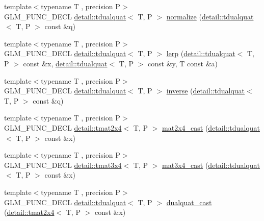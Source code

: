 \begin{DoxyCompactItemize}
\item 
{\footnotesize template$<$typename T , precision P$>$ }\\G\+L\+M\+\_\+\+F\+U\+N\+C\+\_\+\+D\+E\+CL \hyperlink{structglm_1_1detail_1_1tdualquat}{detail\+::tdualquat}$<$ T, P $>$ \hyperlink{group__gtc__dual__quaternion_ga4364d115fe8ee2f65ff047726133d0ad}{normalize} (\hyperlink{structglm_1_1detail_1_1tdualquat}{detail\+::tdualquat}$<$ T, P $>$ const \&q)
\item 
{\footnotesize template$<$typename T , precision P$>$ }\\G\+L\+M\+\_\+\+F\+U\+N\+C\+\_\+\+D\+E\+CL \hyperlink{structglm_1_1detail_1_1tdualquat}{detail\+::tdualquat}$<$ T, P $>$ \hyperlink{group__gtc__dual__quaternion_ga28cbcf029272d5351d4695b8610de126}{lerp} (\hyperlink{structglm_1_1detail_1_1tdualquat}{detail\+::tdualquat}$<$ T, P $>$ const \&x, \hyperlink{structglm_1_1detail_1_1tdualquat}{detail\+::tdualquat}$<$ T, P $>$ const \&y, T const \&a)
\item 
{\footnotesize template$<$typename T , precision P$>$ }\\G\+L\+M\+\_\+\+F\+U\+N\+C\+\_\+\+D\+E\+CL \hyperlink{structglm_1_1detail_1_1tdualquat}{detail\+::tdualquat}$<$ T, P $>$ \hyperlink{group__gtc__dual__quaternion_gaad6b9faeb1134c04defae01426a777f8}{inverse} (\hyperlink{structglm_1_1detail_1_1tdualquat}{detail\+::tdualquat}$<$ T, P $>$ const \&q)
\item 
{\footnotesize template$<$typename T , precision P$>$ }\\G\+L\+M\+\_\+\+F\+U\+N\+C\+\_\+\+D\+E\+CL \hyperlink{structglm_1_1detail_1_1tmat2x4}{detail\+::tmat2x4}$<$ T, P $>$ \hyperlink{group__gtc__dual__quaternion_gade155fb0dfc144259a25897776e73325}{mat2x4\+\_\+cast} (\hyperlink{structglm_1_1detail_1_1tdualquat}{detail\+::tdualquat}$<$ T, P $>$ const \&x)
\item 
{\footnotesize template$<$typename T , precision P$>$ }\\G\+L\+M\+\_\+\+F\+U\+N\+C\+\_\+\+D\+E\+CL \hyperlink{structglm_1_1detail_1_1tmat3x4}{detail\+::tmat3x4}$<$ T, P $>$ \hyperlink{group__gtc__dual__quaternion_ga2f4f0a1275fa95c272dd6ad6df75013d}{mat3x4\+\_\+cast} (\hyperlink{structglm_1_1detail_1_1tdualquat}{detail\+::tdualquat}$<$ T, P $>$ const \&x)
\item 
{\footnotesize template$<$typename T , precision P$>$ }\\G\+L\+M\+\_\+\+F\+U\+N\+C\+\_\+\+D\+E\+CL \hyperlink{structglm_1_1detail_1_1tdualquat}{detail\+::tdualquat}$<$ T, P $>$ \hyperlink{group__gtc__dual__quaternion_gad47c752ec23a5f9924e7d7f84c40f3e5}{dualquat\+\_\+cast} (\hyperlink{structglm_1_1detail_1_1tmat2x4}{detail\+::tmat2x4}$<$ T, P $>$ const \&x)

\end{DoxyCompactItemize}
